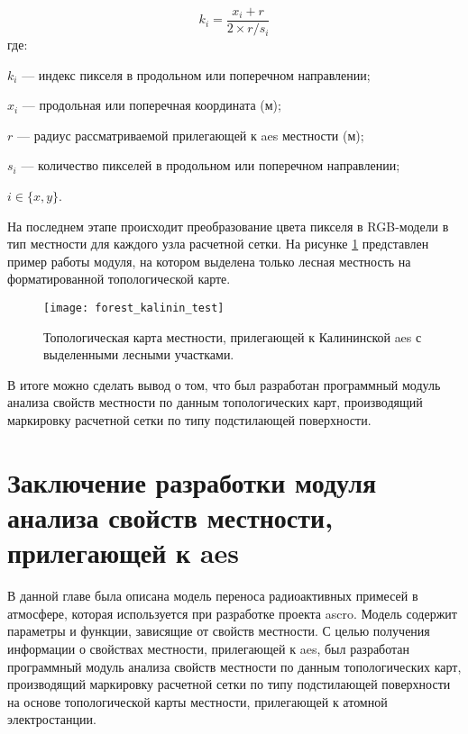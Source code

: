 \begin{equation}
    \label{eq_pix_to_coords}
    k_i = \frac{x_i+r}{2 \times r / s_i}    
\end{equation}
где:
\begin{description}
    \item $k_i$ --- индекс пикселя в продольном или поперечном направлении;
    \item $x_i$ --- продольная или поперечная координата (м);
    \item $r$ --- радиус рассматриваемой прилегающей к \ac{aes} местности (м);
    \item $s_i$ --- количество пикселей в продольном или поперечном направлении;
    \item $i \in \{x, y\}$.
\end{description}

На последнем этапе происходит преобразование цвета пикселя в RGB-модели в тип местности для каждого узла расчетной сетки.
На рисунке \ref{fig_forest_map_scheme} представлен пример работы модуля, на котором выделена только лесная местность 
на форматированной топологической карте. 

\begin{figure}[ht]
\centering
    \texttt{[image: forest\_kalinin\_test]}
    \captionsetup{justification=centering}
    \caption{Топологическая карта местности, прилегающей к Калининской \ac{aes} с выделенными лесными участками.}
    \label{fig_forest_map_scheme}
\end{figure}

В итоге можно сделать вывод о том, что был разработан программный модуль анализа свойств местности по данным 
топологических карт, производящий маркировку расчетной сетки по типу подстилающей поверхности.

\section{Заключение разработки модуля анализа свойств местности, прилегающей к \ac{aes}}

В данной главе была описана модель переноса радиоактивных примесей в атмосфере, которая используется при разработке 
проекта \ac{ascro}. Модель содержит параметры и функции, зависящие от свойств местности. С целью получения информации о 
свойствах местности, прилегающей к \ac{aes}, был разработан программный модуль анализа свойств местности по данным 
топологических карт, производящий маркировку расчетной сетки по типу подстилающей поверхности на основе топологической 
карты местности, прилегающей к атомной электростанции.